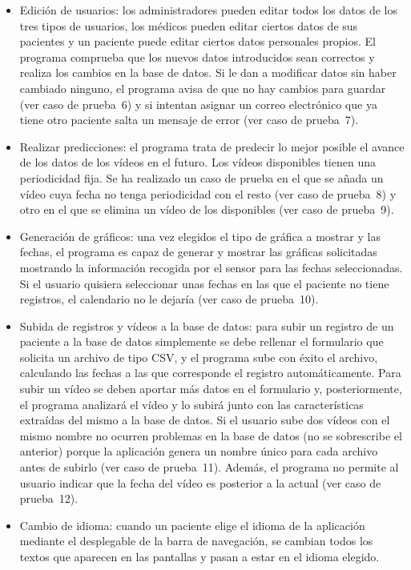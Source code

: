 \begin{itemize}
    \item Edición de usuarios: los administradores pueden editar todos los datos de los tres tipos de usuarios, los médicos pueden editar ciertos datos de sus pacientes y un paciente puede editar ciertos datos personales propios. El programa comprueba que los nuevos datos introducidos sean correctos y realiza los cambios en la base de datos. Si le dan a modificar datos sin haber cambiado ninguno, el programa avisa de que no hay cambios para guardar (ver caso de prueba~6) y si intentan asignar un correo electrónico que ya tiene otro paciente salta un mensaje de error (ver caso de prueba~7).

    \item Realizar predicciones: el programa trata de predecir lo mejor posible el avance de los datos de los vídeos en el futuro. Los vídeos disponibles tienen una periodicidad fija. Se ha realizado un caso de prueba en el que se añada un vídeo cuya fecha no tenga periodicidad con el resto (ver caso de prueba~8) y otro en el que se elimina un vídeo de los disponibles (ver caso de prueba~9).

    \item Generación de gráficos: una vez elegidos el tipo de gráfica a mostrar y las fechas, el programa es capaz de generar y mostrar las gráficas solicitadas mostrando la información recogida por el sensor para las fechas seleccionadas. Si el usuario quisiera seleccionar unas fechas en las que el paciente no tiene registros, el calendario no le dejaría (ver caso de prueba~10).

    \item Subida de registros y vídeos a la base de datos: para subir un registro de un paciente a la base de datos simplemente se debe rellenar el formulario que solicita un archivo de tipo CSV, y el programa sube con éxito el archivo, calculando las fechas a las que corresponde el registro automáticamente. Para subir un vídeo se deben aportar más datos en el formulario y, posteriormente, el programa analizará el vídeo y lo subirá junto con las características extraídas del mismo a la base de datos. Si el usuario sube dos vídeos con el mismo nombre no ocurren problemas en la base de datos (no se sobrescribe el anterior) porque la aplicación genera un nombre único para cada archivo antes de subirlo (ver caso de prueba~11). Además, el programa no permite al usuario indicar que la fecha del vídeo es posterior a la actual (ver caso de prueba~12).

    \item Cambio de idioma: cuando un paciente elige el idioma de la aplicación mediante el desplegable de la barra de navegación, se cambian todos los textos que aparecen en las pantallas y pasan a estar en el idioma elegido.
\end{itemize}


